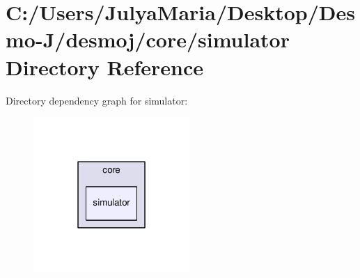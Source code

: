 \section{C\-:/\-Users/\-Julya\-Maria/\-Desktop/\-Desmo-\/\-J/desmoj/core/simulator Directory Reference}
\label{dir_4ceb8dc3a10c53b2f987a9b4134126ea}
Directory dependency graph for simulator\-:
\nopagebreak
\begin{figure}[H]
\begin{center}
\leavevmode
\includegraphics[width=168pt]{dir_4ceb8dc3a10c53b2f987a9b4134126ea_dep}
\end{center}
\end{figure}
